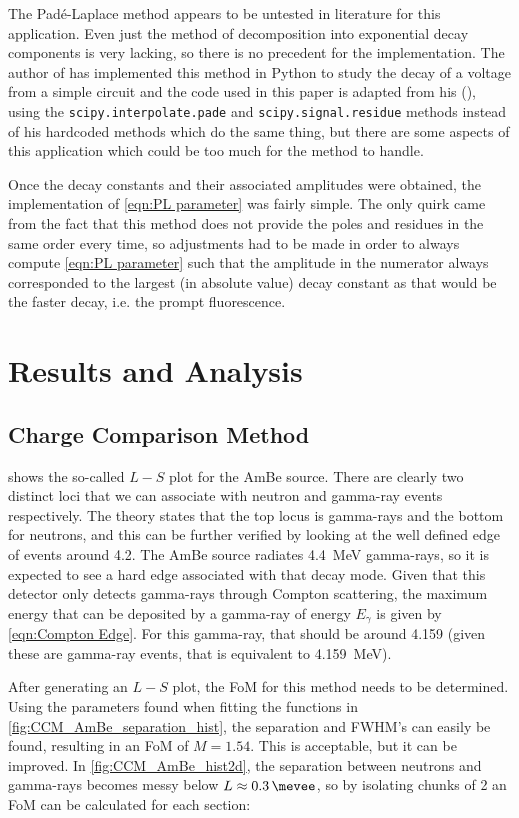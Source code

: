 \documentclass[11pt]{article}
\numberwithin{equation}{section}
\numberwithin{figure}{section}
\numberwithin{table}{section}
\begin{document}
\par The Pad\'e-Laplace method appears to be untested in literature for this application. Even just the method of decomposition into exponential decay components is very lacking, so there is no precedent for the implementation. The author of \cite{Hellen-Pade} has implemented this method in Python to study the decay of a voltage from a simple circuit and the code used in this paper is adapted from his (\cite{Hellen-Code}), using the \texttt{scipy.interpolate.pade} and \texttt{scipy.signal.residue} methods instead of his hardcoded methods which do the same thing, but there are some aspects of this application which could be too much for the method to handle. 

\par Once the decay constants and their associated amplitudes were obtained, the implementation of \cref{eqn:PL parameter} was fairly simple. The only quirk came from the fact that this method does not provide the poles and residues in the same order every time, so adjustments had to be made in order to always compute \cref{eqn:PL parameter} such that the amplitude in the numerator always corresponded to the largest (in absolute value) decay constant as that would be the faster decay, i.e. the prompt fluorescence. 

\section{Results and Analysis}\label{sec:Results and Analysis}
\subsection{Charge Comparison Method}
\par {} shows the so-called $L-S$ plot for the AmBe source. There are clearly two distinct loci that we can associate with neutron and gamma-ray events respectively. The theory states that the top locus is gamma-rays and the bottom for neutrons, and this can be further verified by looking at the well defined edge of events around \SI{4.2}{\mevee}. The AmBe source radiates \SI{4.4}{\mega\electronvolt} gamma-rays, so it is expected to see a hard edge associated with that decay mode. Given that this detector only detects gamma-rays through Compton scattering, the maximum energy that can be deposited by a gamma-ray of energy $E_\gamma$ is given by \cref{eqn:Compton Edge}. For this gamma-ray, that should be around \SI{4.159}{\mevee} (given these are gamma-ray events, that is equivalent to \SI{4.159}{\mega\electronvolt}). 
\par After generating an $L-S$ plot, the FoM for this method needs to be determined. Using the parameters found when fitting the functions in \cref{fig:CCM_AmBe_separation_hist}, the separation and FWHM's can easily be found, resulting in an FoM of $M=1.54$. This is acceptable, but it can be improved. In \cref{fig:CCM_AmBe_hist2d}, the separation between neutrons and gamma-rays becomes messy below $L\approx\SI{0.3}{\mevee}$, so by isolating chunks of \SI{2}{\mevee} an FoM can be calculated for each section: 
\end{document}
